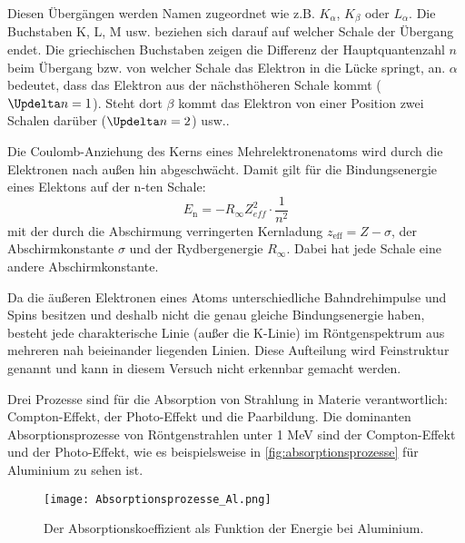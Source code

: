 \documentclass[titlepage = firstcover]{scrartcl}
\begin{document}
        Diesen Übergängen werden Namen zugeordnet wie z.B. $K_\alpha$, $K_\beta$ oder $L_\alpha$. Die Buchstaben K, L, M usw. beziehen sich darauf auf welcher Schale der Übergang endet. Die griechischen Buchstaben zeigen die Differenz der Hauptquantenzahl $n$ beim Übergang bzw. von welcher Schale das Elektron in die Lücke springt, an. $\alpha$ bedeutet, dass das Elektron aus der nächsthöheren Schale kommt ($\Updelta n = 1$). Steht dort $\beta$ kommt das Elektron von einer Position zwei Schalen darüber ($\Updelta n = 2$) usw..

        Die Coulomb-Anziehung des Kerns eines Mehrelektronenatoms wird durch die Elektronen nach außen hin abgeschwächt. Damit gilt für die Bindungsenergie eines Elektons auf der n-ten Schale:
        \begin{equation}
            E_\text{n} = -R_{\infty} Z^2_{eff} \cdot \frac{1}{n^2}
            \label{eqn:bindungsenergie}
        \end{equation}
        mit der durch die Abschirmung verringerten Kernladung $z_\text{eff} = Z - \sigma$, der Abschirmkonstante $\sigma$ und der Rydbergenergie $R_{\infty}$. Dabei hat jede Schale eine andere Abschirmkonstante.

        Da die äußeren Elektronen eines Atoms unterschiedliche Bahndrehimpulse und Spins besitzen und deshalb nicht die genau gleiche Bindungsenergie haben, besteht jede charakterische Linie (außer die K-Linie) im Röntgenspektrum aus mehreren nah beieinander liegenden Linien. Diese Aufteilung wird Feinstruktur genannt und kann in diesem Versuch nicht erkennbar gemacht werden.

        Drei Prozesse sind für die Absorption von Strahlung in Materie verantwortlich: Compton-Effekt, der Photo-Effekt und die Paarbildung.
        Die dominanten Absorptionsprozesse von Röntgenstrahlen unter 1 MeV sind der Compton-Effekt und der Photo-Effekt, wie es beispielsweise in \autoref{fig:absorptionsprozesse} für Aluminium zu sehen ist.
        \begin{figure}[h]
          \centering
          \texttt{[image: Absorptionsprozesse\_Al.png]}
          \caption{Der Absorptionskoeffizient als Funktion der Energie bei Aluminium.}
          \label{fig:absorptionsprozesse}
        \end{figure}
        \FloatBarrier
\end{document}
